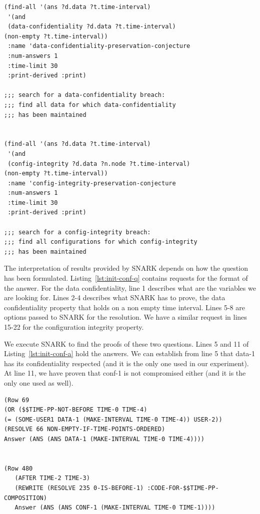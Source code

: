 \begin{lstlisting}[caption=SNARK question to validate the initial situation., label=lst:init-conf-q,captionpos=b] 
(find-all '(ans ?d.data ?t.time-interval)
 '(and
 (data-confidentiality ?d.data ?t.time-interval)
(non-empty ?t.time-interval))
 :name 'data-confidentiality-preservation-conjecture
 :num-answers 1
 :time-limit 30  
 :print-derived :print)

;;; search for a data-confidentiality breach:
;;; find all data for which data-confidentiality
;;; has been maintained


(find-all '(ans ?d.data ?t.time-interval)
 '(and
 (config-integrity ?d.data ?n.node ?t.time-interval)
(non-empty ?t.time-interval))
 :name 'config-integrity-preservation-conjecture
 :num-answers 1
 :time-limit 30  
 :print-derived :print)

;;; search for a config-integrity breach:
;;; find all configurations for which config-integrity
;;; has been maintained
\end{lstlisting}

The interpretation of results provided by SNARK depends on how the question has been formulated.
Listing~\ref{lst:init-conf-q} contains requests for the format of the answer.
For the data confidentiality, line 1 describes what are the variables we are looking for. Lines 2-4 describes what SNARK has to prove, \ie the data confidentiality property that holds on a non empty time interval.
Lines 5-8 are options passed to SNARK for the resolution.
We have a similar request in lines 15-22 for the configuration integrity property.

We execute SNARK to find the proofs of these two questions.
Lines 5 and 11 of Listing~\ref{lst:init-conf-a} hold the answers.
We can establish from line 5 that data-1 has its confidentiality respected (and it is the only one used in our experiment).
At line 11, we have proven that conf-1 is not compromised either (and it is the only one used as well).

\begin{lstlisting}[caption=SNARK validating the initial situation, label=lst:init-conf-a,captionpos=b] 
(Row 69
(OR ($$TIME-PP-NOT-BEFORE TIME-0 TIME-4) 
(= (SOME-USER1 DATA-1 (MAKE-INTERVAL TIME-0 TIME-4)) USER-2))
(RESOLVE 66 NON-EMPTY-IF-TIME-POINTS-ORDERED)
Answer (ANS (ANS DATA-1 (MAKE-INTERVAL TIME-0 TIME-4)))) 


(Row 480
   (AFTER TIME-2 TIME-3)
   (REWRITE (RESOLVE 235 0-IS-BEFORE-1) :CODE-FOR-$$TIME-PP-COMPOSITION)
   Answer (ANS (ANS CONF-1 (MAKE-INTERVAL TIME-0 TIME-1)))) 
\end{lstlisting}


